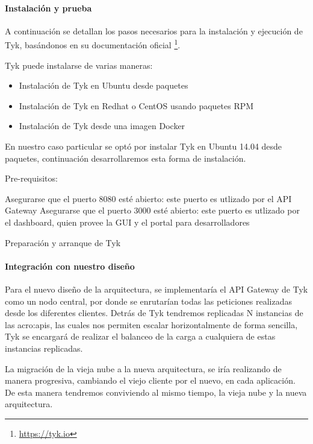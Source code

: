 \paragraph{Instalación y prueba}

A continuación se detallan los pasos necesarios para la instalación y ejecución de Tyk, basándonos en su documentación oficial \footnote{\url{https://tyk.io}}.

Tyk puede instalarse de varias maneras:

\begin{itemize}
  \item Instalación de Tyk en Ubuntu desde paquetes
  \item Instalación de Tyk en Redhat o CentOS usando paquetes RPM
  \item Instalación de Tyk desde una imagen Docker
\end{itemize}

En nuestro caso particular se optó por instalar Tyk en Ubuntu 14.04 desde paquetes, continuación desarrollaremos esta forma de instalación.

Pre-requisitos:

Asegurarse que el puerto 8080 esté abierto: este puerto es utlizado por el API Gateway
Asegurarse que el puerto 3000 esté abierto: este puerto es utlizado por el dashboard, quien provee la GUI y el portal para desarrolladores

\begin{listing}[H]
  \caption{Preparación y arranque de Tyk}
  \label{soa:tecnologias:tyk:bash-preparacion}
\end{listing}


\paragraph{Integración con nuestro diseño}

Para el nuevo diseño de la arquitectura, se implementaría el API Gateway de Tyk como un nodo central, por donde se enrutarían todas las peticiones realizadas desde los diferentes clientes.  Detrás de Tyk tendremos replicadas N instancias de las \glspl{acro:api}, las cuales nos permiten escalar horizontalmente de forma sencilla, Tyk se encargará de realizar el balanceo de la carga a cualquiera de estas instancias replicadas.

La migración de la vieja nube a la nueva arquitectura, se iría realizando de manera progresiva, cambiando el viejo cliente por el nuevo, en cada aplicación.  De esta manera tendremos conviviendo al mismo tiempo, la vieja nube y la nueva arquitectura.

